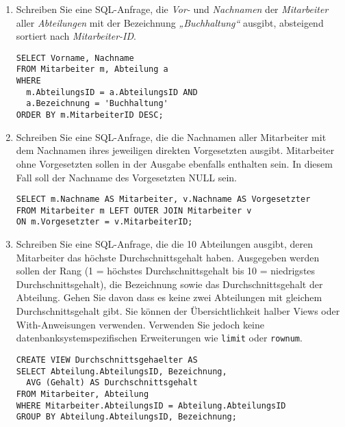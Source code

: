 \documentclass{lehramt-informatik-aufgabe}
\begin{document}
\begin{enumerate}


\item Schreiben Sie eine SQL-Anfrage, die \emph{Vor-} und
\emph{Nachnamen} der \emph{Mitarbeiter} aller \emph{Abteilungen} mit der
Bezeichnung \emph{„Buchhaltung“} ausgibt, absteigend sortiert nach
\emph{Mitarbeiter-ID}.

\begin{liAntwort}
\begin{verbatim}
SELECT Vorname, Nachname
FROM Mitarbeiter m, Abteilung a
WHERE
  m.AbteilungsID = a.AbteilungsID AND
  a.Bezeichnung = 'Buchhaltung'
ORDER BY m.MitarbeiterID DESC;
\end{verbatim}
\end{liAntwort}


\item Schreiben Sie eine SQL-Anfrage, die die Nachnamen aller
Mitarbeiter mit dem Nachnamen ihres jeweiligen direkten Vorgesetzten
ausgibt. Mitarbeiter ohne Vorgesetzten sollen in der Ausgabe ebenfalls
enthalten sein. In diesem Fall soll der Nachname des Vorgesetzten NULL
sein.

\begin{liAntwort}
\begin{verbatim}
SELECT m.Nachname AS Mitarbeiter, v.Nachname AS Vorgesetzter
FROM Mitarbeiter m LEFT OUTER JOIN Mitarbeiter v
ON m.Vorgesetzter = v.MitarbeiterID;
\end{verbatim}
\end{liAntwort}


\item Schreiben Sie eine SQL-Anfrage, die die 10 Abteilungen ausgibt,
deren Mitarbeiter das höchste Durchschnittsgehalt haben. Ausgegeben
werden sollen der Rang (1 = höchstes Durchschnittsgehalt bis 10 =
niedrigstes Durchschnittsgehalt), die Bezeichnung sowie das
Durchschnittsgehalt der Abteilung. Gehen Sie davon dass es keine zwei
Abteilungen mit gleichem Durchschnittsgehalt gibt. Sie können der
Übersichtlichkeit halber Views oder With-Anweisungen verwenden.
Verwenden Sie jedoch keine datenbanksystemspezifischen Erweiterungen wie
\verb|limit| oder \verb|rownum|.

\begin{liAntwort}
\begin{verbatim}
CREATE VIEW Durchschnittsgehaelter AS
SELECT Abteilung.AbteilungsID, Bezeichnung,
  AVG (Gehalt) AS Durchschnittsgehalt
FROM Mitarbeiter, Abteilung
WHERE Mitarbeiter.AbteilungsID = Abteilung.AbteilungsID
GROUP BY Abteilung.AbteilungsID, Bezeichnung;


\end{verbatim}
\end{liAntwort}
\end{enumerate}
\end{document}
